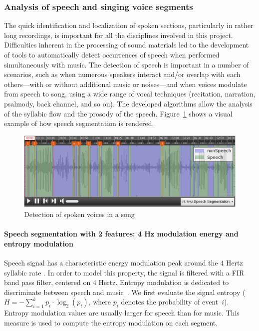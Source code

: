 \documentclass{sig-alternate}
\newcommand{\squeezeup}{\vspace{-2.5mm}}
\begin{document}
\subsubsection{Analysis of speech and singing voice segments}
The quick identification and localization of spoken sections, particularly in rather long recordings, is important for all the disciplines involved in this project. Difficulties inherent in the processing of sound materials led to the development of tools to automatically detect occurrences of speech when performed simultaneously with music. The detection of speech is important in a number of scenarios, such as when numerous speakers interact and/or overlap with each others---with or without additional music or noises---and when voices modulate from speech to song, using a wide range of vocal techniques (recitation, narration, psalmody, back channel, and so on). The developed algorithms allow the analysis of the syllabic flow and the prosody of the speech. 
Figure~\ref{fig:speech_detection} shows a visual example of how speech segmentation is rendered.

\begin{figure}[htb]
  \centering
 \includegraphics[width=\linewidth]{img/IRIT_Speech4Hz.png} 
  \caption{Detection of spoken voices in a song}
  \label{fig:speech_detection}
\end{figure}

\squeezeup\paragraph{Speech segmentation with 2 features: 4 Hz modulation energy and entropy modulation} 
Speech signal has a characteristic energy modulation peak around the 4 Hertz syllabic rate \cite{Houtgast1985}. In order to model this property, the signal is filtered with a FIR band pass filter, centered on 4 Hertz.
Entropy modulation is dedicated to discriminate between speech and music~\cite{Pinquier2003}. We first evaluate the signal entropy ($H=-\sum_{i=1}^{k}p_i\cdot \log_2(p_i)$, where $p_i$ denotes the probability of event~$i$). Entropy modulation values are usually larger for speech than for music. This measure is used to compute the entropy modulation on each segment. 
\end{document}
